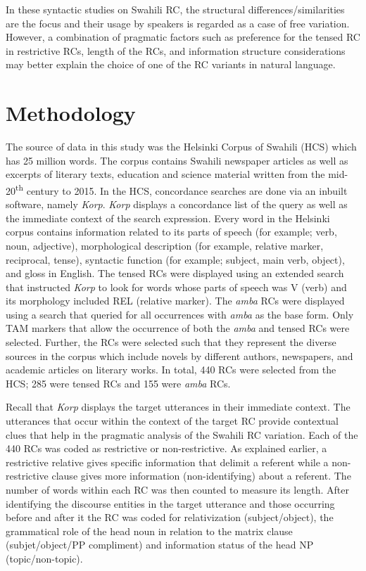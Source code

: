 \documentclass[output=paper,colorlinks,citecolor=brown]{langscibook}
\begin{document}
In these syntactic studies on Swahili RC, the structural differences/similarities are the focus and their usage by speakers is regarded as a case of free variation. However, a combination of pragmatic factors such as preference for the tensed RC in restrictive RCs, length of the RCs, and information structure considerations may better explain the choice of one of the RC variants in natural language.

\section{Methodology}\label{sec:mwamzandi:3}

The source of data in this study was the Helsinki Corpus of Swahili (HCS) which has 25 million words. The corpus contains Swahili newspaper articles as well as excerpts of literary texts, education and science material written from the mid-20\textsuperscript{th} century to 2015. In the HCS, concordance searches are done via an inbuilt software, namely \textit{Korp}. \textit{Korp} displays a concordance list of the query as well as the immediate context of the search expression. Every word in the Helsinki corpus contains information related to its parts of speech (for example; verb, noun, adjective), morphological description (for example, relative marker, reciprocal, tense), syntactic function (for example; subject, main verb, object), and gloss in English. The tensed RCs were displayed using an extended search that instructed \textit{Korp} to look for words whose parts of speech was V (verb) and its morphology included REL (relative marker). The \textit{amba} RCs were displayed using a search that queried for all occurrences with \textit{amba} as the base form. Only TAM markers that allow the occurrence of both the \textit{amba} and tensed RCs were selected. Further, the RCs were selected such that they represent the diverse sources in the corpus which include novels by different authors, newspapers, and academic articles on literary works. In total, 440 RCs were selected from the HCS; 285 were tensed RCs and 155 were \textit{amba} RCs.

Recall that \textit{Korp} displays the target utterances in their immediate context. The utterances that occur within the context of the target RC provide contextual clues that help in the pragmatic analysis of the Swahili RC variation. Each of the 440 RCs was coded as restrictive or non-restrictive. As explained earlier, a restrictive relative gives specific information that delimit a referent while a non-restrictive clause gives more information (non-identifying) about a referent. The number of words within each RC was then counted to measure its length. After identifying the discourse entities in the target utterance and those occurring before and after it the RC was coded for relativization (subject/object), the grammatical role of the head noun in relation to the matrix clause (subjet/object/PP compliment) and information status of the head NP (topic/non-topic).
\end{document}
